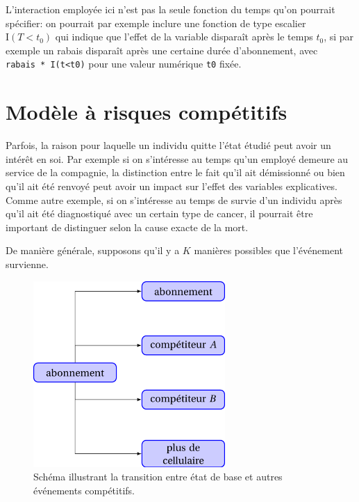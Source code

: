 \documentclass[
  11pt,
  letterpaper,
]{scrbook}
\theoremstyle{definition}
\theoremstyle{remark}
\begin{document}
L'interaction employée ici n'est pas la seule fonction du temps qu'on
pourrait spécifier: on pourrait par exemple inclure une fonction de type
escalier \(\mathrm{I}(T< t_0)\) qui indique que l'effet de la variable
disparaît après le temps \(t_0\), si par exemple un rabais disparaît
après une certaine durée d'abonnement, avec
\texttt{rabais\ *\ I(t\textless{}t0)} pour une valeur numérique
\texttt{t0} fixée.

\hypertarget{moduxe8le-uxe0-risques-compuxe9titifs}{%
\section{Modèle à risques
compétitifs}\label{moduxe8le-uxe0-risques-compuxe9titifs}}

Parfois, la raison pour laquelle un individu quitte l'état étudié peut
avoir un intérêt en soi. Par exemple si on s'intéresse au temps qu'un
employé demeure au service de la compagnie, la distinction entre le fait
qu'il ait démissionné ou bien qu'il ait été renvoyé peut avoir un impact
sur l'effet des variables explicatives. Comme autre exemple, si on
s'intéresse au temps de survie d'un individu après qu'il ait été
diagnostiqué avec un certain type de cancer, il pourrait être important
de distinguer selon la cause exacte de la mort.

De manière générale, supposons qu'il y a \(K\) manières possibles que
l'événement survienne.

\begin{figure}[ht!]

{\centering \includegraphics[width=0.65\textwidth,height=\textheight]{figures/transition_etats_modele_risque_competitifs.png}

}

\caption{\label{fig-transitionetat}Schéma illustrant la transition entre
état de base et autres événements compétitifs.}

\end{figure}
\end{document}

